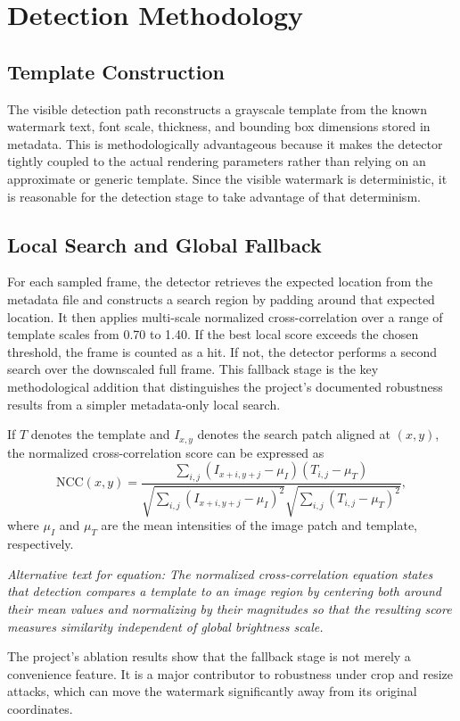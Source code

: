 \documentclass[12pt,oneside]{report}
\newcommand{\FormulaAlt}[1]{\par\small\textit{Alternative text for equation: #1}\normalsize}
\begin{document}
\section{Detection Methodology}
\subsection{Template Construction}
The visible detection path reconstructs a grayscale template from the known watermark text, font scale, thickness, and bounding box dimensions stored in metadata. This is methodologically advantageous because it makes the detector tightly coupled to the actual rendering parameters rather than relying on an approximate or generic template. Since the visible watermark is deterministic, it is reasonable for the detection stage to take advantage of that determinism.

\subsection{Local Search and Global Fallback}
For each sampled frame, the detector retrieves the expected location from the metadata file and constructs a search region by padding around that expected location. It then applies multi-scale normalized cross-correlation over a range of template scales from 0.70 to 1.40. If the best local score exceeds the chosen threshold, the frame is counted as a hit. If not, the detector performs a second search over the downscaled full frame. This fallback stage is the key methodological addition that distinguishes the project's documented robustness results from a simpler metadata-only local search.

If $T$ denotes the template and $I_{x,y}$ denotes the search patch aligned at $(x,y)$, the normalized cross-correlation score can be expressed as
\begin{equation}
\mathrm{NCC}(x,y) =
\frac{\sum\limits_{i,j}(I_{x+i,y+j}-\mu_I)(T_{i,j}-\mu_T)}
{\sqrt{\sum\limits_{i,j}(I_{x+i,y+j}-\mu_I)^2}\sqrt{\sum\limits_{i,j}(T_{i,j}-\mu_T)^2}},
\end{equation}
where $\mu_I$ and $\mu_T$ are the mean intensities of the image patch and template, respectively.
\FormulaAlt{The normalized cross-correlation equation states that detection compares a template to an image region by centering both around their mean values and normalizing by their magnitudes so that the resulting score measures similarity independent of global brightness scale.}

The project's ablation results show that the fallback stage is not merely a convenience feature. It is a major contributor to robustness under crop and resize attacks, which can move the watermark significantly away from its original coordinates.
\end{document}
